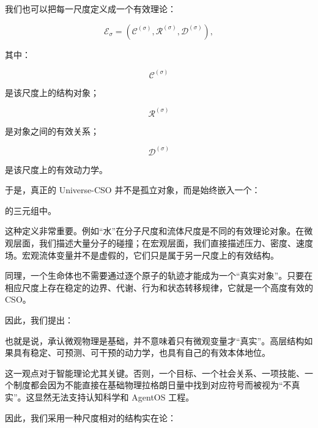 我们也可以把每一尺度定义成一个有效理论：

\[
\mathcal{E}_{\sigma}
=
\left(
\mathcal{C}^{(\sigma)},
\mathcal{R}^{(\sigma)},
\mathcal{D}^{(\sigma)}
\right),
\]

其中：

\[
\mathcal{C}^{(\sigma)}
\]

是该尺度上的结构对象；

\[
\mathcal{R}^{(\sigma)}
\]

是对象之间的有效关系；

\[
\mathcal{D}^{(\sigma)}
\]

是该尺度上的有效动力学。

于是，真正的 Universe-CSO 并不是孤立对象，而是始终嵌入一个：

\begin{statementbox}
\centering
{}
\end{statementbox}

的三元组中。

这种定义非常重要。例如“水”在分子尺度和流体尺度是不同的有效理论对象。在微观层面，我们描述大量分子的碰撞；在宏观层面，我们直接描述压力、密度、速度场。宏观流体变量并不是虚假的，它们只是属于另一尺度上的有效结构。

同理，一个生命体也不需要通过逐个原子的轨迹才能成为一个“真实对象”。只要在相应尺度上存在稳定的边界、代谢、行为和状态转移规律，它就是一个高度有效的 CSO。

因此，我们提出：

\begin{statementbox}
\centering
{}
\end{statementbox}

也就是说，承认微观物理是基础，并不意味着只有微观变量才“真实”。高层结构如果具有稳定、可预测、可干预的动力学，也具有自己的有效本体地位。

这一观点对于智能理论尤其关键。否则，一个目标、一个社会关系、一项技能、一个制度都会因为不能直接在基础物理拉格朗日量中找到对应符号而被视为“不真实”。这显然无法支持认知科学和 AgentOS 工程。

因此，我们采用一种尺度相对的结构实在论：

\begin{statementbox}
\centering
{}
\end{statementbox}

